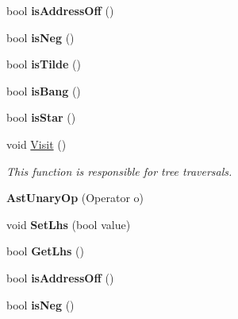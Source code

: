 \begin{DoxyCompactItemize}
\item 
\hypertarget{classAstUnaryOp_a636862fa8cc5f8308eeed666e8cce5a4}{bool {\bfseries is\-Address\-Off} ()}\label{classAstUnaryOp_a636862fa8cc5f8308eeed666e8cce5a4}

\item 
\hypertarget{classAstUnaryOp_a7dddcaa6c182d6012e35d124c25c8e22}{bool {\bfseries is\-Neg} ()}\label{classAstUnaryOp_a7dddcaa6c182d6012e35d124c25c8e22}

\item 
\hypertarget{classAstUnaryOp_a02f2cdfdcf75a4c41cfd2168465c16b0}{bool {\bfseries is\-Tilde} ()}\label{classAstUnaryOp_a02f2cdfdcf75a4c41cfd2168465c16b0}

\item 
\hypertarget{classAstUnaryOp_ab9c6693eaa03da4daf18dc43f01c73d5}{bool {\bfseries is\-Bang} ()}\label{classAstUnaryOp_ab9c6693eaa03da4daf18dc43f01c73d5}

\item 
\hypertarget{classAstUnaryOp_aab9cd20f2a71757480827cb44b7cb0a3}{bool {\bfseries is\-Star} ()}\label{classAstUnaryOp_aab9cd20f2a71757480827cb44b7cb0a3}

\item 
void \hyperlink{classAstUnaryOp_a23e13d42f33d5882d58ca48e8053f1a0}{Visit} ()
\begin{DoxyCompactList}\small\item\em This function is responsible for tree traversals. \end{DoxyCompactList}\item 
\hypertarget{classAstUnaryOp_aa363b2df2fbb4653a683899e59df2080}{{\bfseries Ast\-Unary\-Op} (Operator o)}\label{classAstUnaryOp_aa363b2df2fbb4653a683899e59df2080}

\item 
\hypertarget{classAstUnaryOp_a8fa646529a84c26cab9b3e39ed1c726c}{void {\bfseries Set\-Lhs} (bool value)}\label{classAstUnaryOp_a8fa646529a84c26cab9b3e39ed1c726c}

\item 
\hypertarget{classAstUnaryOp_a00fb9d26303867cc8ed269df7092975f}{bool {\bfseries Get\-Lhs} ()}\label{classAstUnaryOp_a00fb9d26303867cc8ed269df7092975f}

\item 
\hypertarget{classAstUnaryOp_a636862fa8cc5f8308eeed666e8cce5a4}{bool {\bfseries is\-Address\-Off} ()}\label{classAstUnaryOp_a636862fa8cc5f8308eeed666e8cce5a4}

\item 
\hypertarget{classAstUnaryOp_a7dddcaa6c182d6012e35d124c25c8e22}{bool {\bfseries is\-Neg} ()}\label{classAstUnaryOp_a7dddcaa6c182d6012e35d124c25c8e22}


\end{DoxyCompactItemize}
